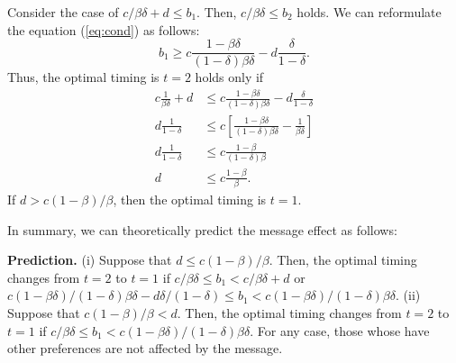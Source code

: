 \documentclass[
]{article}
\begin{document}
Consider the case of \(c/\beta\delta + d \le b_1\). Then, \(c/\beta\delta \le b_2\) holds. We can reformulate the equation (\ref{eq:cond}) as follows:
\begin{equation}
  b_1 \ge c \frac{1 - \beta\delta}{(1-\delta)\beta\delta} - d \frac{\delta}{1 - \delta}. \label{eq:t1cond-2}
\end{equation}
Thus, the optimal timing is \(t = 2\) holds only if
\begin{equation}
  \begin{split}
    c\frac{1}{\beta\delta} + d &\le c \frac{1 - \beta\delta}{(1-\delta)\beta\delta} - d \frac{\delta}{1 - \delta} \\
    d \frac{1}{1-\delta} &\le c\left[\frac{1 - \beta\delta}{(1-\delta)\beta\delta} - \frac{1}{\beta\delta} \right] \\
    d \frac{1}{1-\delta} &\le c \frac{1-\beta}{(1-\delta)\beta} \\
    d &\le c \frac{1-\beta}{\beta}.
  \end{split}
\end{equation}
If \(d > c (1-\beta)/\beta\), then the optimal timing is \(t = 1\).

In summary, we can theoretically predict the message effect as follows:

\noindent
\textbf{Prediction.} (i) Suppose that \(d \le c(1-\beta)/\beta\). Then, the optimal timing changes from \(t = 2\) to \(t = 1\) if \(c/\beta\delta \le b_1 < c/\beta\delta + d\) or \(c(1-\beta\delta)/(1-\delta)\beta\delta - d\delta/(1-\delta) \le b_1 < c(1-\beta\delta)/(1-\delta)\beta\delta\). (ii) Suppose that \(c(1-\beta)/\beta < d\). Then, the optimal timing changes from \(t=2\) to \(t=1\) if \(c/\beta\delta \le b_1 < c(1-\beta\delta)/(1-\delta)\beta\delta\). For any case, those whose have other preferences are not affected by the message.

  
\end{document}
